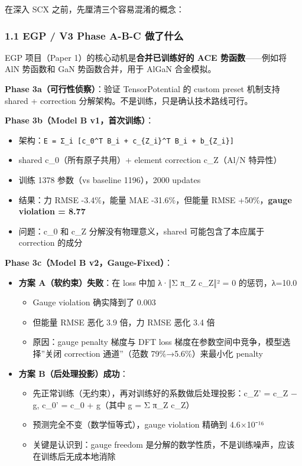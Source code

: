 \documentclass[
  12pt,
]{ctexart}
\providecommand{\tightlist}{%
  \setlength{\itemsep}{0pt}\setlength{\parskip}{0pt}}
\begin{document}
在深入 SCX 之前，先厘清三个容易混淆的概念：

\subsubsection{1.1 EGP / V3 Phase A-B-C
做了什么}\label{egp-v3-phase-a-b-c-ux505aux4e86ux4ec0ux4e48}

EGP 项目（Paper 1）的核心动机是\textbf{合并已训练好的 ACE
势函数}------例如将 AlN 势函数和 GaN 势函数合并，用于 AlGaN 合金模拟。

\textbf{Phase 3a（可行性侦察）}：验证 TensorPotential 的 custom preset
机制支持 shared + correction 分解架构。不是训练，只是确认技术路线可行。

\textbf{Phase 3b（Model B v1，首次训练）}：

\begin{itemize}
\tightlist
\item
  架构：\texttt{E\ =\ Σ\_i\ {[}c\_0\^{}T\ B\_i\ +\ c\_\{Z\_i\}\^{}T\ B\_i\ +\ b\_\{Z\_i\}{]}}
\item
  shared c\_0（所有原子共用）+ element correction c\_Z（Al/N 特异性）
\item
  训练 1378 参数（vs baseline 1196），2000 updates
\item
  结果：力 RMSE -3.4\%，能量 MAE -31.6\%，但能量 RMSE
  +50\%，\textbf{gauge violation = 8.77}
\item
  问题：c\_0 和 c\_Z 分解没有物理意义，shared 可能包含了本应属于
  correction 的成分
\end{itemize}

\textbf{Phase 3c（Model B v2，Gauge-Fixed）}：

\begin{itemize}
\tightlist
\item
  \textbf{方案 A（软约束）失败}：在 loss 中加 λ·‖Σ π\_Z c\_Z‖² = 0
  的惩罚，λ=10.0

  \begin{itemize}
  \tightlist
  \item
    Gauge violation 确实降到了 0.003
  \item
    但能量 RMSE 恶化 3.9 倍，力 RMSE 恶化 3.4 倍
  \item
    原因：gauge penalty 梯度与 DFT loss
    梯度在参数空间中竞争，模型选择''关闭 correction 通道''（范数
    79\%→5.6\%）来最小化 penalty
  \end{itemize}
\item
  \textbf{方案 B（后处理投影）成功}：

  \begin{itemize}
  \tightlist
  \item
    先正常训练（无约束），再对训练好的系数做后处理投影：c\_Z' = c\_Z −
    g, c\_0' = c\_0 + g（其中 g = Σ π\_Z c\_Z）
  \item
    预测完全不变（数学恒等式），gauge violation 精确到 4.6×10⁻¹⁶
  \item
    关键是认识到：gauge freedom
    是分解的数学性质，不是训练噪声，应该在训练后无成本地消除
  \end{itemize}
\end{itemize}
\end{document}
